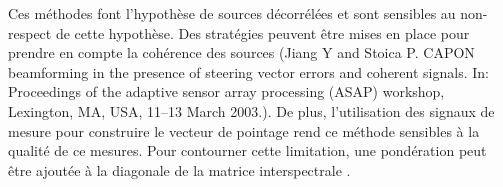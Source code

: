 Ces méthodes font l'hypothèse de sources décorrélées et sont sensibles au non-respect de cette hypothèse. Des stratégies peuvent être mises en place pour prendre en compte la cohérence des sources (Jiang Y and Stoica P. CAPON beamforming in the presence of steering vector errors and coherent signals. In: Proceedings of the adaptive sensor array processing (ASAP) workshop, Lexington, MA,
USA, 11–13 March 2003.). 
De plus, l'utilisation des signaux de mesure pour construire le vecteur de pointage rend ce méthode sensibles à la qualité de ce mesures. Pour contourner cette limitation, une pondération peut être ajoutée à la diagonale de la matrice interspectrale \citep{li_2003}.\\



